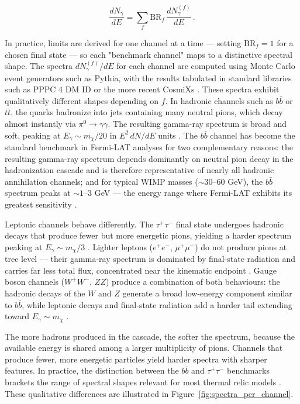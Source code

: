 \begin{equation}
	\frac{dN_\gamma}{dE} = \sum_f \text{BR}_f \, \frac{dN_\gamma^{(f)}}{dE} \,.
	\label{eq:spectrum_sum}
\end{equation}

In practice, limits are derived for one channel at a time --- setting $\text{BR}_f = 1$ for a chosen final state --- so each "benchmark channel" maps to a distinctive spectral shape.
The spectra $dN_\gamma^{(f)}/dE$ for each channel are computed using Monte Carlo event generators such as Pythia, with the results tabulated in standard libraries such as PPPC 4 DM ID \cite{Cirelli:2010xx} or the more recent CosmiXs \cite{Arina:2023eic}.
These spectra exhibit qualitatively different shapes depending on $f$.
In hadronic channels such as $b\bar{b}$ or $t\bar{t}$, the quarks hadronize into jets containing many neutral pions, which decay almost instantly via $\pi^0 \to \gamma\gamma$.
The resulting gamma-ray spectrum is broad and soft, peaking at $E_\gamma \sim m_\chi / 20$ in $E^2 \, dN/dE$ units \cite{Hooper:2024,Cirelli:2024ssz}.
The $b\bar{b}$ channel has become the standard benchmark in Fermi-LAT analyses for two complementary reasons: the resulting gamma-ray spectrum depends dominantly on neutral pion decay in the hadronization cascade and is therefore representative of nearly all hadronic annihilation channels; and for typical WIMP masses ($\sim 30$--$60$ GeV), the $b\bar{b}$ spectrum peaks at $\sim 1$--$3$ GeV --- the energy range where Fermi-LAT exhibits its greatest sensitivity \cite{Hooper:2024}.

Leptonic channels behave differently.
The $\tau^+\tau^-$ final state undergoes hadronic decays that produce fewer but more energetic pions, yielding a harder spectrum peaking at $E_\gamma \sim m_\chi / 3$ \cite{Hooper:2024}.
Lighter leptons ($e^+e^-$, $\mu^+\mu^-$) do not produce pions at tree level --- their gamma-ray spectrum is dominated by final-state radiation and carries far less total flux, concentrated near the kinematic endpoint \cite{Cirelli:2024ssz}.
Gauge boson channels ($W^+W^-$, $ZZ$) produce a combination of both behaviours: the hadronic decays of the $W$ and $Z$ generate a broad low-energy component similar to $b\bar{b}$, while leptonic decays and final-state radiation add a harder tail extending toward $E_\gamma \sim m_\chi$ \cite{Cirelli:2024ssz,Hooper:2024}.

The more hadrons produced in the cascade, the softer the spectrum, because the available energy is shared among a larger multiplicity of pions.
Channels that produce fewer, more energetic particles yield harder spectra with sharper features.
In practice, the distinction between the $b\bar{b}$ and $\tau^+\tau^-$ benchmarks brackets the range of spectral shapes relevant for most thermal relic models \cite{Hooper:2024}.
These qualitative differences are illustrated in Figure~\ref{fig:spectra_per_channel}.

